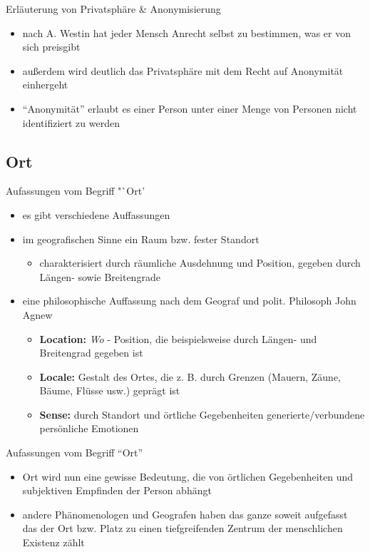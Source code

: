 \begin{frame}{Erläuterung von Privatsphäre \& Anonymisierung}
\begin{itemize}
  \item nach A. Westin hat jeder Mensch Anrecht selbst zu bestimmen, was er von sich preisgibt
  \item außerdem wird deutlich das Privatsphäre mit dem Recht auf Anonymität einhergeht
  \item "`Anonymität"' erlaubt es einer Person unter einer Menge von Personen nicht identifiziert zu werden
\end{itemize}
\end{frame}

\subsection*{Ort}
\begin{frame}{Aufassungen vom Begriff "`Ort'}
\begin{itemize}
  \item es gibt verschiedene Auffassungen
  \item im geografischen Sinne ein Raum bzw. fester Standort
  \begin{itemize}
    \item charakterisiert durch räumliche Ausdehnung und Position, gegeben durch Längen- sowie Breitengrade
  \end{itemize}
  \item eine philosophische Auffassung nach dem Geograf und polit. Philosoph John Agnew
  \begin{itemize}
    \item \textbf{Location:} \textit{Wo} - Position, die beispielsweise durch Längen- und Breitengrad gegeben ist
    \item \textbf{Locale:} Gestalt des Ortes, die z. B. durch Grenzen (Mauern, Zäune, Bäume, Flüsse usw.) geprägt ist
    \item \textbf{Sense:} durch Standort und örtliche Gegebenheiten generierte/verbundene persönliche Emotionen
  \end{itemize}
\end{itemize}
\end{frame}

\begin{frame}{Aufassungen vom Begriff "`Ort"'}
\begin{itemize}
  \item Ort wird nun eine gewisse Bedeutung, die von örtlichen Gegebenheiten und subjektiven Empfinden der Person abhängt
  \item andere Phänomenologen und Geografen haben das ganze soweit aufgefasst das der Ort bzw. Platz zu einen tiefgreifenden Zentrum der menschlichen Existenz zählt
\end{itemize}
\end{frame}

